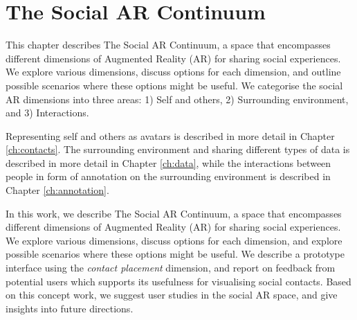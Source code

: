 \chapter{The Social AR Continuum} %
\label{ch:continuum} %

This chapter describes The Social AR Continuum, a space that encompasses different dimensions of Augmented Reality (AR) for sharing social experiences. We explore various dimensions, discuss options for each dimension, and outline possible scenarios where these options might be useful. We categorise the social AR dimensions into three areas: 1) Self and others, 2) Surrounding environment, and 3) Interactions.

Representing self and others as avatars is described in more detail in Chapter \ref{ch:contacts}. The surrounding environment and sharing different types of data is described in more detail in Chapter \ref{ch:data}, while the interactions between people in form of annotation on the surrounding environment is described in Chapter \ref{ch:annotation}.




In this work, we describe The Social AR Continuum, a space that encompasses different dimensions of Augmented Reality (AR) for sharing social experiences. We explore various dimensions, discuss options for each dimension, and explore possible scenarios where these options might be useful. We describe a prototype interface using the \textit{contact placement} dimension, and report on feedback from potential users which supports its usefulness for visualising social contacts. Based on this concept work, we suggest user studies in the social AR space, and give insights into future directions. 

